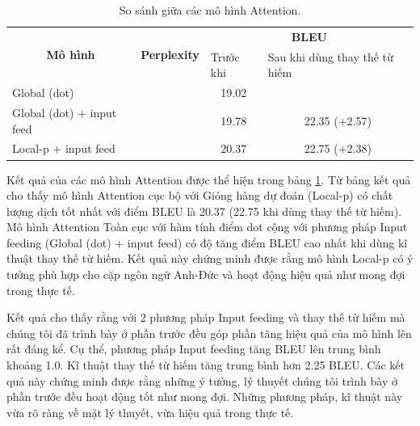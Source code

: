 \begin{table}
	\centering
	\begin{tabular}{|l|l|c|c|} 
		\hline
		\multicolumn{1}{|c|}{\multirow{2}{*}{\textbf{Mô hình} }} & \multicolumn{1}{c|}{\multirow{2}{*}{\textbf{Perplexity} }} & \multicolumn{2}{c|}{\textbf{BLEU}}                                                   \\ 
		\cline{3-4}
		\multicolumn{1}{|c|}{}                                   & \multicolumn{1}{c|}{}                                      & \multicolumn{1}{l|}{Trước khi} & \multicolumn{1}{l|}{Sau khi dùng thay thế từ hiếm}  \\ 
		\hline
		Global (dot)                                             &                                                            & 19.02                          &                                                     \\ 
		\hline
		Global (dot) + input feed                                &                                                            & 19.78                          & 22.35 (+2.57)                                              \\ 
		\hline
		Local-p + input feed                                     &                                                            & 20.37                          & 22.75 (+2.38)                                               \\
		\hline
	\end{tabular}
	\caption{So sánh giữa các mô hình Attention.}
	\label{tab_attn_vs_attn}
\end{table}
Kết quả của các mô hình Attention được thể hiện trong bảng \ref{tab_attn_vs_attn}. 
Từ bảng kết quả cho thấy mô hình Attention cục bộ với Gióng hàng dự đoán (Local-p) có chất lượng dịch tốt nhất với điểm BLEU là 20.37 (22.75 khi dùng thay thế từ hiếm). Mô hình Attention Toàn cục với hàm tính điểm dot cộng với phương pháp Input feeding (Global (dot) + input feed) có độ tăng điểm BLEU cao nhất khi dùng kĩ thuật thay thế từ hiếm. Kết quả này chứng minh được rằng mô hình Local-p có ý tưởng phù hợp cho cặp ngôn ngữ Anh-Đức và hoạt động hiệu quả như mong đợi trong thực tế. 
 
Kết quả cho thấy rằng với 2 phương pháp Input feeding và thay thế từ hiếm mà chúng tôi đã trình bày ở phần trước đều góp phần tăng hiệu quả của mô hình lên rất đáng kể. Cụ thể, phương pháp Input feeding tăng BLEU lên trung bình khoảng 1.0. Kĩ thuật thay thế từ hiếm tăng trung bình hơn 2.25 BLEU. Các kết quả này chứng minh được rằng những ý tưởng, lý thuyết chúng tôi trình bày ở phần trước đều hoạt động tốt như mong đợi. Những phương pháp, kĩ thuật này vừa rõ ràng về mặt lý thuyết, vừa hiệu quả trong thực tế.

